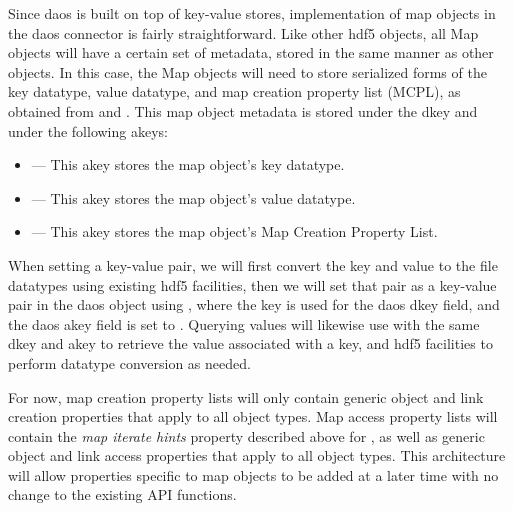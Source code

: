 \documentclass[../design_doc.tex]{subfiles}
\begin{document}
Since \acrshort{daos} is built on top of key-value stores, implementation of map objects in the \acrshort{daos} \gls{connector} is fairly straightforward. Like other \acrshort{hdf5} objects, all Map objects will have a certain set of metadata, stored in the same manner as other objects. In this case, the Map objects will need to store serialized forms of the key datatype, value datatype, and map creation property list (MCPL), as obtained from  and .
This map object metadata is stored under the  \gls{dkey} and under the following \glspl{akey}:

\begin{itemize}
 \item {} --- This \gls{akey} stores the map object's key datatype.
 \item {} --- This \gls{akey} stores the map object's value datatype.
 \item {} --- This \gls{akey} stores the map object's Map Creation Property List.
\end{itemize}

When setting a key-value pair, we will first convert the key and value to the file datatypes using existing \acrshort{hdf5} facilities, then we will set that pair as a key-value pair in the \acrshort{daos} object using , where the key is used for the \acrshort{daos} \gls{dkey} field, and the \acrshort{daos} \gls{akey} field is set to . Querying values will likewise use  with the same \gls{dkey} and \gls{akey} to retrieve the value associated with a key, and \acrshort{hdf5} facilities to perform datatype conversion as needed.

For now, map creation property lists will only contain generic object and link creation properties that apply to all object types. Map access property lists will contain the \textit{map iterate hints} property described above for , as well as generic object and link access properties that apply to all object types. This architecture will allow properties specific to map objects to be added at a later time with no change to the existing API functions.
\end{document}

